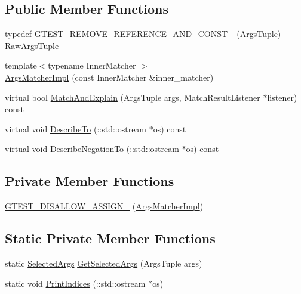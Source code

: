 \subsection*{Public Member Functions}
\begin{DoxyCompactItemize}
\item 
typedef \mbox{\hyperlink{classtesting_1_1internal_1_1_args_matcher_impl_a7b0cadc369c0c20cd254cc2052782301}{G\+T\+E\+S\+T\+\_\+\+R\+E\+M\+O\+V\+E\+\_\+\+R\+E\+F\+E\+R\+E\+N\+C\+E\+\_\+\+A\+N\+D\+\_\+\+C\+O\+N\+S\+T\+\_\+}} (Args\+Tuple) Raw\+Args\+Tuple
\item 
{\footnotesize template$<$typename Inner\+Matcher $>$ }\\\mbox{\hyperlink{classtesting_1_1internal_1_1_args_matcher_impl_a7f7a9a826d130d11fe30633d79f59a06}{Args\+Matcher\+Impl}} (const Inner\+Matcher \&inner\+\_\+matcher)
\item 
virtual bool \mbox{\hyperlink{classtesting_1_1internal_1_1_args_matcher_impl_a60383b3073a61f9d82cbf31fe19e6bfa}{Match\+And\+Explain}} (Args\+Tuple args, Match\+Result\+Listener $\ast$listener) const
\item 
virtual void \mbox{\hyperlink{classtesting_1_1internal_1_1_args_matcher_impl_a8e057f67b368f7d94aeb0ddd35837c94}{Describe\+To}} (\+::std\+::ostream $\ast$os) const
\item 
virtual void \mbox{\hyperlink{classtesting_1_1internal_1_1_args_matcher_impl_ac8ff5369879836567cedb5434bcca5b9}{Describe\+Negation\+To}} (\+::std\+::ostream $\ast$os) const
\end{DoxyCompactItemize}
\subsection*{Private Member Functions}
\begin{DoxyCompactItemize}
\item 
\mbox{\hyperlink{classtesting_1_1internal_1_1_args_matcher_impl_a6ef9d2868258271039d001e20f5f7fb2}{G\+T\+E\+S\+T\+\_\+\+D\+I\+S\+A\+L\+L\+O\+W\+\_\+\+A\+S\+S\+I\+G\+N\+\_\+}} (\mbox{\hyperlink{classtesting_1_1internal_1_1_args_matcher_impl}{Args\+Matcher\+Impl}})
\end{DoxyCompactItemize}
\subsection*{Static Private Member Functions}
\begin{DoxyCompactItemize}
\item 
static \mbox{\hyperlink{classtesting_1_1internal_1_1_args_matcher_impl_ab061679f6251e56ccbedaf0c316d00ff}{Selected\+Args}} \mbox{\hyperlink{classtesting_1_1internal_1_1_args_matcher_impl_a168a7d6a82bd20fd6b1c777ab64c34a5}{Get\+Selected\+Args}} (Args\+Tuple args)
\item 
static void \mbox{\hyperlink{classtesting_1_1internal_1_1_args_matcher_impl_a2ea95d7970a1874c9616e42009ae53b0}{Print\+Indices}} (\+::std\+::ostream $\ast$os)
\end{DoxyCompactItemize}
